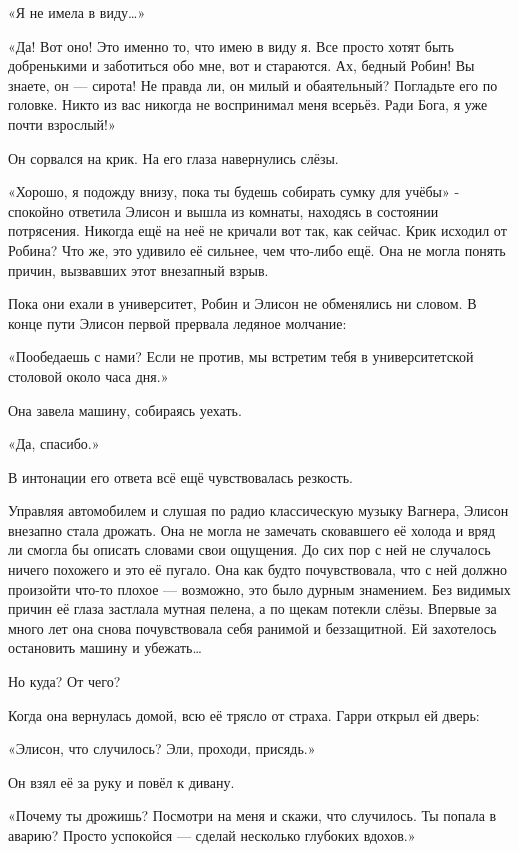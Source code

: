 \documentclass[a4paper,12pt]{book}
\begin{document}
«Я не имела в виду…»
\par
«Да! Вот оно! Это именно то, что имею в виду я. Все просто хотят быть добренькими и заботиться обо мне, вот и стараются. Ах, бедный Робин! Вы знаете, он — сирота! Не правда ли, он милый и обаятельный? Погладьте его по головке. Никто из вас никогда не воспринимал меня всерьёз. Ради Бога, я уже почти взрослый!»
\par
Он сорвался на крик. На его глаза навернулись слёзы.\\
\par
«Хорошо, я подожду внизу, пока ты будешь собирать сумку для учёбы» - спокойно ответила Элисон и вышла из комнаты, находясь в состоянии потрясения. Никогда ещё на неё не кричали вот так, как сейчас. Крик исходил от Робина? Что же, это удивило её сильнее, чем что-либо ещё. Она не могла понять причин, вызвавших этот внезапный взрыв.\\
\par
Пока они ехали в университет, Робин и Элисон не обменялись ни словом. В конце пути Элисон первой прервала ледяное молчание:
\par
«Пообедаешь с нами? Если не против, мы встретим тебя в университетской столовой около часа дня.»
\par
Она завела машину, собираясь уехать.
\par
«Да, спасибо.»
\par
В интонации его ответа всё ещё чувствовалась резкость.\\
\par
Управляя автомобилем и слушая по радио классическую музыку Вагнера, Элисон внезапно стала дрожать. Она не могла не замечать сковавшего её холода и вряд ли смогла бы описать словами свои ощущения. До сих пор с ней не случалось ничего похожего и это её пугало. Она как будто почувствовала, что с ней должно произойти что-то плохое — возможно, это было дурным знамением. Без видимых причин её глаза застлала мутная пелена, а по щекам потекли слёзы. Впервые за много лет она снова почувствовала себя ранимой и беззащитной. Ей захотелось остановить машину и убежать…
\par
Но куда? От чего?\\
\par
Когда она вернулась домой, всю её трясло от страха. Гарри открыл ей дверь:
\par
«Элисон, что случилось? Эли, проходи, присядь.»
\par
Он взял её за руку и повёл к дивану.
\par
«Почему ты дрожишь? Посмотри на меня и скажи, что случилось. Ты попала в аварию? Просто успокойся — сделай несколько глубоких вдохов.»
\end{document}
